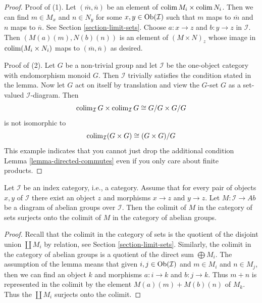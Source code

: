 \begin{proof}
Proof of (1). Let $(\overline{m}, \overline{n})$
be an element of $\mathop{\mathrm{colim}}\nolimits M_i \times \mathop{\mathrm{colim}}\nolimits N_i$.
Then we can find $m \in M_x$ and $n \in N_y$ for some
$x, y \in \mathop{\mathrm{Ob}}\nolimits(\mathcal{I})$ such that $m$ maps to
$\overline{m}$ and $n$ maps to $\overline{n}$. See
Section \ref{section-limit-sets}.
Choose $a : x \to z$ and $b : y \to z$
in $\mathcal{I}$. Then $(M(a)(m), N(b)(n))$ is an element of
$(M \times N)_z$ whose image in $\mathop{\mathrm{colim}}\nolimits (M_i \times N_i)$
maps to $(\overline{m}, \overline{n})$ as desired.

\medskip\noindent
Proof of (2). Let $G$ be a non-trivial group and
let $\mathcal{I}$ be the one-object category with endomorphism monoid $G$.
Then $\mathcal{I}$ trivially satisfies the condition stated in the lemma.
Now let $G$ act on itself by translation and view the $G$-set $G$
as a set-valued $\mathcal{I}$-diagram. Then
$$
\mathop{\mathrm{colim}}\nolimits_\mathcal{I} G \times \mathop{\mathrm{colim}}\nolimits_\mathcal{I} G \cong G/G \times G/G
$$
is not isomorphic to
$$
\mathop{\mathrm{colim}}\nolimits_\mathcal{I} (G \times G) \cong (G \times G)/G
$$
This example indicates that you cannot just drop the additional
condition Lemma \ref{lemma-directed-commutes}
even if you only care about finite products.
\end{proof}

\begin{lemma}
\label{lemma-colimits-abelian-as-sets}
Let $\mathcal{I}$ be an index category, i.e., a category. Assume
that for every pair of objects $x, y$ of $\mathcal{I}$
there exist an object $z$ and morphisms $x \to z$ and $y \to z$.
Let $M : \mathcal{I} \to \textit{Ab}$ be a diagram of abelian
groups over $\mathcal{I}$. Then the colimit of $M$ in the category
of sets surjects onto the colimit of $M$ in the category of
abelian groups.
\end{lemma}

\begin{proof}
Recall that the colimit in the category of sets is the quotient of
the disjoint union $\coprod M_i$ by relation, see
Section \ref{section-limit-sets}.
Similarly, the colimit in the category of abelian groups is a quotient
of the direct sum $\bigoplus M_i$.
The assumption of the lemma means that given $i, j \in \mathop{\mathrm{Ob}}\nolimits(\mathcal{I})$
and $m \in M_i$ and $n \in M_j$, then we can find an object
$k$ and morphisms $a : i \to k$ and $b : j \to k$.
Thus $m + n$ is represented in the colimit by the element
$M(a)(m) + M(b)(n)$ of $M_k$. Thus the $\coprod M_i$
surjects onto the colimit.
\end{proof}

